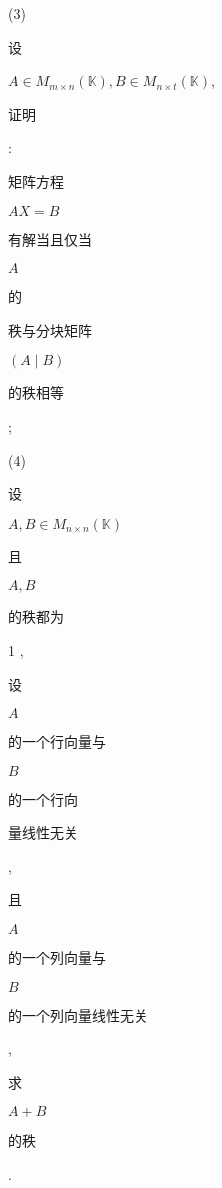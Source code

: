 \documentclass[10pt]{article}
\begin{document}
(3) \begin{CJK}{UTF8}{mj}设\end{CJK} $A \in M_{m \times n}(\mathbb{K}), B \in M_{n \times t}(\mathbb{K})$, \begin{CJK}{UTF8}{mj}证明\end{CJK}: \begin{CJK}{UTF8}{mj}矩阵方程\end{CJK} $A X=B$ \begin{CJK}{UTF8}{mj}有解当且仅当\end{CJK} $A$ \begin{CJK}{UTF8}{mj}的\end{CJK} \begin{CJK}{UTF8}{mj}秩与分块矩阵\end{CJK} $(A \mid B)$ \begin{CJK}{UTF8}{mj}的秩相等\end{CJK};

(4) \begin{CJK}{UTF8}{mj}设\end{CJK} $A, B \in M_{n \times n}(\mathbb{K})$ \begin{CJK}{UTF8}{mj}且\end{CJK} $A, B$ \begin{CJK}{UTF8}{mj}的秩都为\end{CJK} 1 , \begin{CJK}{UTF8}{mj}设\end{CJK} $A$ \begin{CJK}{UTF8}{mj}的一个行向量与\end{CJK} $B$ \begin{CJK}{UTF8}{mj}的一个行向\end{CJK} \begin{CJK}{UTF8}{mj}量线性无关\end{CJK}, \begin{CJK}{UTF8}{mj}且\end{CJK} $A$ \begin{CJK}{UTF8}{mj}的一个列向量与\end{CJK} $B$ \begin{CJK}{UTF8}{mj}的一个列向量线性无关\end{CJK}, \begin{CJK}{UTF8}{mj}求\end{CJK} $A+B$ \begin{CJK}{UTF8}{mj}的秩\end{CJK}.
\end{document}
